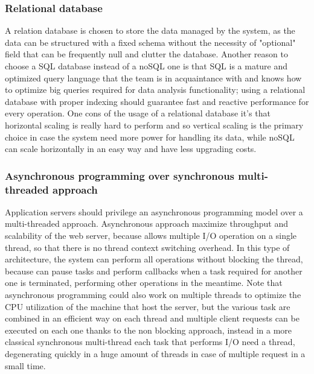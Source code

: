 \subsubsection{Relational database}
A relation database is chosen to store the data managed by the system, as the data can be structured with a fixed schema without the necessity of "optional" field that can be frequently null and clutter the database. Another reason to choose a SQL database instead of a noSQL one is that SQL is a mature and optimized query language that the team is in acquaintance with and knows how to optimize big queries required for data analysis functionality; using a relational database with proper indexing should guarantee fast and reactive performance for every operation. One cons of the usage of a relational database it's that horizontal scaling is really hard to perform and so vertical scaling is the primary choice in case the system need more power for handling its data, while noSQL can scale horizontally in an easy way and have less upgrading costs.

\subsubsection{Asynchronous programming over synchronous multi-threaded approach}
Application servers should privilege an asynchronous programming model over a multi-threaded approach. Asynchronous approach maximize throughput and scalability of the web server, because allows multiple I/O operation on a single thread, so that there is no thread context switching overhead. In this type of architecture, the system can perform all operations without blocking the thread, because can pause tasks and perform callbacks when a task required for another one is terminated, performing other operations in the meantime. Note that asynchronous programming could also work on multiple threads to optimize the CPU utilization of the machine that host the server, but the various task are combined in an efficient way on each thread and multiple client requests can be executed on each one thanks to the non blocking approach, instead in a more classical synchronous multi-thread each task that performs I/O need a thread, degenerating quickly in a huge amount of threads in case of multiple request in a small time.